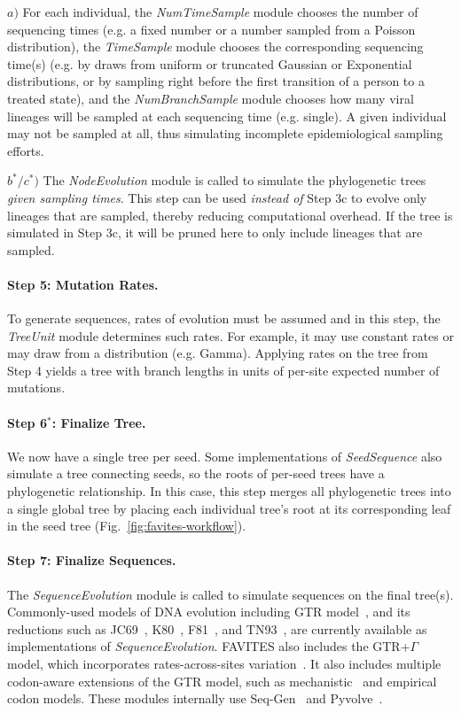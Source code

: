 $a)$ For each individual, the \textit{NumTimeSample} module chooses the number of sequencing times (e.g. a fixed number or a number sampled from a Poisson distribution), the \textit{TimeSample} module chooses the corresponding sequencing time(s) (e.g. by draws from uniform or truncated Gaussian or Exponential distributions, or by sampling right before the first transition of a person to a treated state), and the \textit{NumBranchSample} module chooses how many viral lineages will be sampled at each sequencing time (e.g. single). A given individual may not be sampled at all, thus simulating incomplete epidemiological sampling efforts.

$b^*/c^*)$ The \textit{NodeEvolution} module is called to simulate the phylogenetic trees \textit{given sampling times}. 
This step can be used \textit{instead of} Step 3c to evolve only lineages that are sampled, thereby reducing computational overhead.
If the tree is simulated in Step 3c, it will be pruned here to only include lineages that are sampled.

\paragraph{Step 5: Mutation Rates.} To generate sequences, rates of evolution must be assumed and in this step, the \textit{TreeUnit} module determines such rates. For example, it may use constant rates or may draw from a distribution (e.g. Gamma). Applying rates on the tree from Step 4 yields a tree with branch lengths in units of per-site expected number of mutations.

\paragraph{Step 6$^*$: Finalize Tree.} We now have a single tree per seed. Some implementations of \textit{SeedSequence} also simulate a tree connecting seeds, so the roots of per-seed trees have a phylogenetic relationship. In this case,  this step merges all phylogenetic trees into a single global tree by placing each individual tree's root at its corresponding leaf in the seed tree (Fig.~\ref{fig:favites-workflow}).

\paragraph{Step 7: Finalize Sequences.} The \textit{SequenceEvolution} module is called to simulate sequences on the final tree(s). Commonly-used models of DNA evolution including \gls{GTR} model~\cite{Tavare1986}, and its reductions such as \gls{JC69}~\cite{Jukes1969}, \gls{K80}~\cite{Kimura1980}, \gls{F81}~\cite{Felsenstein1981}, and \gls{TN93}~\cite{Tamura1993}, are currently available as implementations of \textit{SequenceEvolution}. FAVITES also includes the \gls{GTR}+$\Gamma$ model, which incorporates rates-across-sites variation~\cite{Yang1994}. It also includes multiple codon-aware extensions of the \gls{GTR} model, such as mechanistic~\cite{Zaheri2014} and empirical~\cite{Kosiol2007} codon models. These modules internally use Seq-Gen~\cite{Rambaut1997} and Pyvolve~\cite{Spielman2015}.

